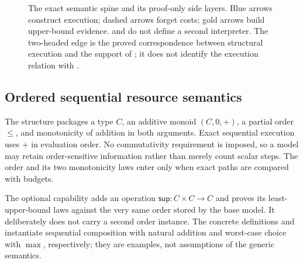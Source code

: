 \begin{figure}[t]
{}
  \caption{The exact semantic spine and its proof-only side layers.  Blue
    arrows construct execution; dashed arrows forget costs; gold arrows build
    upper-bound evidence.   and  do not
    define a second interpreter.  The two-headed edge is the proved
    correspondence between structural execution and the support of
    ; it does not identify the execution relation with
    .}
  \label{fig:exact-program-spine}
\end{figure}

\subsection{Ordered sequential resource semantics}

The structure  packages a type \(C\), an additive monoid
\((C,0,+)\), a partial order \(\leq\), and monotonicity of addition in both
arguments.  Exact sequential execution uses \(+\) in evaluation order.  No
commutativity requirement is imposed, so a model may retain order-sensitive
information rather than merely count scalar steps.  The order and its two
monotonicity laws enter only when exact paths are compared with budgets.

The optional capability  adds an operation
\(\mathsf{sup}:C\times C\to C\) and proves its least-upper-bound laws against
the very same order stored by the base model.  It deliberately does not carry
a second order instance.  The concrete definitions  and
 instantiate sequential composition with natural
addition and worst-case choice with \(\max\), respectively; they are examples,
not assumptions of the generic semantics.

